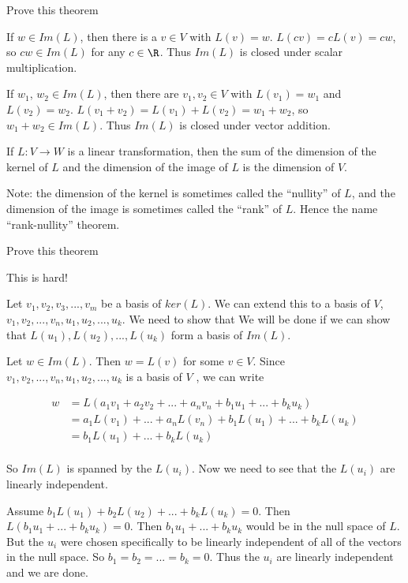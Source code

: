 \documentclass{ximera}
\begin{document}
Prove this theorem

\begin{free-response}
	If $w \in Im(L)$, then there is a $v \in V$ with $L(v) =w$.  $L(cv) = cL(v)=cw$, so $cw \in Im(L)$ for any $c\in \R$. 
	 Thus $Im(L)$ is closed under scalar multiplication.
	 
	 If $w_1$, $w_2 \in Im(L)$, then there are $v_1,v_2 \in V$ with $L(v_1)=w_1$ and $L(v_2)=w_2$.  $L(v_1+v_2)=L(v_1)+L(v_2)=w_1+w_2$, so $w_1+w_2 \in Im(L)$.
	 Thus $Im(L)$ is closed under vector addition.
\end{free-response}

\begin{theorem}
	If $L:V \to W$ is a linear transformation, then the sum of the dimension of the kernel of $L$ and the dimension of the image of $L$ is the dimension of $V$.
 \end{theorem}
 
 Note:  the dimension of the kernel is sometimes called the ``nullity'' of $L$, and the dimension of the image is sometimes called the ``rank'' of $L$.  
 Hence the name ``rank-nullity'' theorem.
 
 Prove this theorem
 
 \begin{warning}
 This is hard!
 \end{warning}
 
 \begin{free-response}
 	Let $v_1,v_2,v_3,...,v_m$ be a basis of $ker(L)$.  We can extend this to a basis of $V$, $v_1,v_2,...,v_n,u_1,u_2,...,u_k$.  We need to show that 
 	We will be done if we can show that $L(u_1),L(u_2),...,L(u_k)$ form a basis of $Im(L)$.
 	
 	Let $w \in Im(L)$.  Then $w = L(v)$ for some $v \in V$.  Since $v_1,v_2,...,v_n,u_1,u_2,...,u_k$ is a basis of $V$ , we can write
 	
 	\begin{align*}
 		w &= L( a_1v_1+a_2v_2+...+a_nv_n+b_1u_1+...+b_ku_k)\\
 			&=a_1L(v_1)+...+a_nL(v_n)+b_1L(u_1)+...+b_kL(u_k)\\
 			&=b_1L(u_1)+...+b_kL(u_k)\\
 	\end{align*}
 	
 	So $Im(L)$ is spanned by the $L(u_i)$.  Now we need to see that the $L(u_i)$ are linearly independent.
 	
 	Assume $b_1L(u_1)+b_2L(u_2)+...+b_kL(u_k) = 0$.  Then $L(b_1u_1+...+b_ku_k) = 0$.  Then $b_1u_1+...+b_ku_k$ would be in the null space of $L$.  But
 	the $u_i$ were chosen specifically to be linearly independent of all of the vectors in the null space.  So $b_1=b_2=...=b_k = 0$.   Thus the $u_i$ are linearly independent
 	and we are done.
 \end{free-response}
\end{document}
